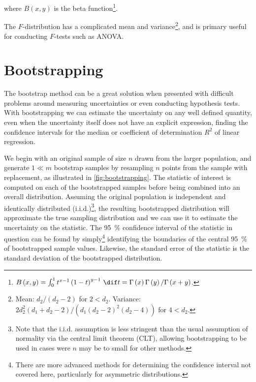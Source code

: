 \noindent where $B\left(x,y\right)$ is the beta function\footnote{$B\left(x,y\right) = \int_{0}^{1} t^{x-1} \left(1-t\right)^{y-1} \, \dif t = \Gamma\left(x\right)\Gamma\left(y\right) / \Gamma\left(x+y\right)$.}.

The $F$-distribution has a complicated
mean and variance\footnote{Mean: $d_{2}/\left(d_{2}-2\right)$ for $2 < d_{2}$.
Variance: $2 d_{2}^{2}\left(d_{1}+d_{2}-2\right)/\left(d_{1}\left(d_{2}-2\right)^{2}\left(d_{2}-4\right)\right)$ for $4 < d_{2}$.},
and is primary useful for conducting $F$-tests such as ANOVA.

\section{Bootstrapping}
\label{stats:bootstrapping}

The bootstrap method can be a great solution when presented with difficult problems
around measuring uncertainties or even conducting hypothesis tests.
With bootstrapping we can estimate the uncertainty on any well defined quantity,
even when the uncertainty itself does not have an explicit expression,
\eg finding the confidence intervals for the median
or coefficient of determination $R^{2}$ of linear regression.

We begin with an original sample of size $n$ drawn from the larger population,
and generate $1 \ll m$ bootstrap samples by resampling $n$ points from the sample with replacement,
as illustrated in \cref{fig:bootstrapping}.
The statistic of interest is computed on each of the bootstrapped samples
before being combined into an overall distribution.
Assuming the original population is independent and identically distributed (i.i.d.)\footnote{Note
that the i.i.d. assumption is less stringent than
the usual assumption of normality via the central limit theorem (CLT),
allowing bootstrapping to be used in cases were $n$ may be to small for other methods.},
the resulting bootstrapped distribution will approximate the true sampling distribution
and we can use it to estimate the uncertainty on the statistic.
The \SI{95}{\percent} confidence interval of the statistic in question
can be found by simply\footnote{There are
more advanced methods for determining the confidence interval not covered here,
particularly for asymmetric distributions.} identifying
the boundaries of the central \SI{95}{\percent} of bootstrapped sample values.
Likewise, the standard error of the statistic is the standard deviation of the bootstrapped distribution.

